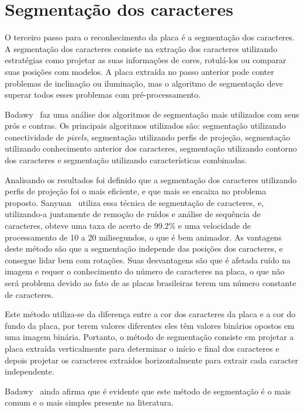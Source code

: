 \section{Segmentação dos caracteres}
\label{sec:segmentacao}

O terceiro passo para o reconhecimento da placa é a segmentação dos caracteres.
A segmentação dos caracteres consiste na extração dos caracteres utilizando
estratégias como projetar as suas informações de cores, rotulá-los ou comparar
suas posições com modelos. A placa extraída no passo anterior pode conter
problemas de inclinação ou iluminação, mas o algoritmo de segmentação deve
superar todos esses problemas com pré-processamento.~\cite{s2013automatic}

Badawy~\cite{s2013automatic} faz uma análise dos algoritmos de segmentação mais
utilizados com seus prós e contras.  Os principais algoritmos utilizados são:
segmentação utilizando conectividade de \emph{pixels}, segmentação utilizando
perfis de projeção, segmentação utilizando conhecimento anterior dos caracteres,
segmentação utilizando contorno dos caracteres e segmentação utilizando
características combinadas.

Analisando os resultados foi definido que a segmentação dos caracteres
utilizando perfis de projeção foi o mais eficiente, e que mais se encaixa no
problema proposto. Sanyuan~\cite{sanyuan2004car} utiliza essa técnica de
segmentação de caracteres, e, utilizando-a juntamente de remoção de ruídos e
análise de sequência de caracteres, obteve uma taxa de acerto de 99.2\% e uma
velocidade de processamento de 10 a 20 milisegundos, o que é bem animador. As
vantagens deste método são que a segmentação independe das posições dos
caracteres, e consegue lidar bem com rotações. Suas desvantagens são que é
afetada ruído na imagem e requer o conhecimento do número de caracteres na
placa, o que não será problema devido ao fato de as placas brasileiras terem um
número constante de caracteres.

Este método utiliza-se da diferença entre a cor dos caracteres da placa e a cor
do fundo da placa, por terem valores diferentes eles têm valores binários
opostos em uma imagem binária. Portanto, o método de segmentação consiste em
projetar a placa extraída verticalmente para determinar o início e final dos
caracteres e depois projetar os caracteres extraídos horizontalmente para
extrair cada caracter independente.

Badawy~\cite{s2013automatic} ainda afirma que é evidente que este método de
segmentação é o mais comum e o mais simples presente na literatura.

